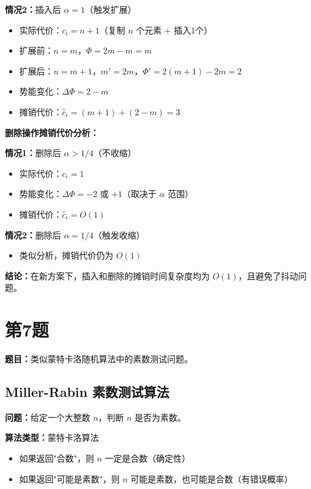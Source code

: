 \documentclass[UTF8,12pt,a4paper]{ctexart}
\begin{document}
\textbf{情况2：}插入后 $\alpha = 1$（触发扩展）
\begin{itemize}
	\item 实际代价：$c_i = n + 1$（复制 $n$ 个元素 + 插入1个）
	\item 扩展前：$n = m$，$\Phi = 2m - m = m$
	\item 扩展后：$n = m + 1$，$m' = 2m$，$\Phi' = 2(m+1) - 2m = 2$
	\item 势能变化：$\Delta \Phi = 2 - m$
	\item 摊销代价：$\hat{c}_i = (m + 1) + (2 - m) = 3$
\end{itemize}

\textbf{删除操作摊销代价分析：}

\textbf{情况1：}删除后 $\alpha > 1/4$（不收缩）
\begin{itemize}
	\item 实际代价：$c_i = 1$
	\item 势能变化：$\Delta \Phi = -2$ 或 $+1$（取决于 $\alpha$ 范围）
	\item 摊销代价：$\hat{c}_i = O(1)$
\end{itemize}

\textbf{情况2：}删除后 $\alpha = 1/4$（触发收缩）
\begin{itemize}
	\item 类似分析，摊销代价仍为 $O(1)$
\end{itemize}

\textbf{结论：}在新方案下，插入和删除的摊销时间复杂度均为 $O(1)$，且避免了抖动问题。


\section*{第7题}
\textbf{题目：}类似蒙特卡洛随机算法中的素数测试问题。

\subsection*{Miller-Rabin 素数测试算法}

\textbf{问题：}给定一个大整数 $n$，判断 $n$ 是否为素数。

\textbf{算法类型：}蒙特卡洛算法
\begin{itemize}
	\item 如果返回"合数"，则 $n$ 一定是合数（确定性）
	\item 如果返回"可能是素数"，则 $n$ 可能是素数，也可能是合数（有错误概率）
\end{itemize}
\end{document}
